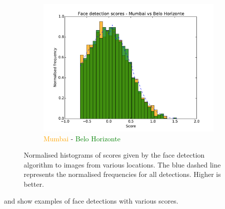 \begin{figure}
\begin{subfigure}[b]{0.49\textwidth}
      \includegraphics[width=\textwidth]{figures/results/scores_hist_Mumbai_Belo_Horizonte}
      \caption{\textcolor{orange}{Mumbai} - \textcolor{green}{Belo Horizonte}}
    \end{subfigure}
\caption{Normalised histograms of scores given by the face detection algorithm
to images from various locations. The blue dashed line represents the
normalised frequencies for all detections. Higher is better.}
\label{fig:results:fd:scores_hist}
\end{figure}

 and 
show examples of face detections with various scores.

